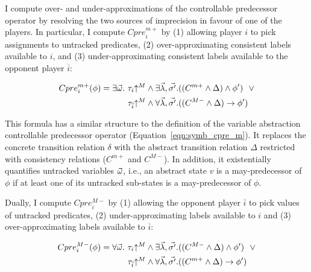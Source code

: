 I compute over- and under-approximations of the controllable predecessor operator by resolving the two sources of imprecision in favour of one of the players.  In particular, I compute $Cpre_i^{m+}$ by (1) allowing player $i$ to pick assignments to untracked predicates, (2) over-approximating consistent labels available to $i$, and (3) under-approximating consistent labels available to the opponent player $\overline{i}$:

\begin{equation}
\label{e:cprem}
\begin{aligned}
    Cpre_i^{m+}(\phi) = \exists \vec{\omega} .~&\tau_i\mathord{\uparrow^M}         \land \exists \vec{\lambda},\vec{\sigma'}. ((C^{m+} \land \Delta) \land \phi')
                                                 ~~\lor\\
                                                &\tau_{\overline{i}}\mathord{\uparrow^M} \land \forall \vec{\lambda},\vec{\sigma'}. ((C^{M-} \land\Delta) \rightarrow \phi')
\end{aligned}
\end{equation}

This formula has a similar structure to the definition of the variable abstraction controllable predecessor operator (Equation~\ref{eqn:symb_cpre_m}).  It replaces the concrete transition relation $\delta$ with the abstract transition relation $\Delta$ restricted with consistency relations ($C^{m+}$ and $C^{M-}$).  In addition, it existentially quantifies untracked variables $\vec{\omega}$, i.e., an abstract state $v$ is a may-predecessor of $\phi$ if at least one of its untracked sub-states is a may-predecessor of $\phi$.

Dually, I compute $Cpre_i^{M-}$ by (1) allowing the opponent player $\overline{i}$ to pick values of untracked predicates, (2) under-approximating labels available to $i$ and (3) over-approximating labels available to $\overline{i}$:

\begin{equation}
\label{e:cpreM}
\begin{aligned}
    Cpre_i^{M-}(\phi) = \forall \vec{\omega}.~&\tau_i\mathord{\uparrow^M}         \land \exists \vec{\lambda},\vec{\sigma'}. ((C^{M-} \land \Delta) \land \phi')
                                             ~~\lor\\
                                               &\tau_{\overline{i}}\mathord{\uparrow^M} \land \forall \vec{\lambda},\vec{\sigma'}. ((C^{m+} \land \Delta) \rightarrow \phi')
\end{aligned}
\end{equation}

